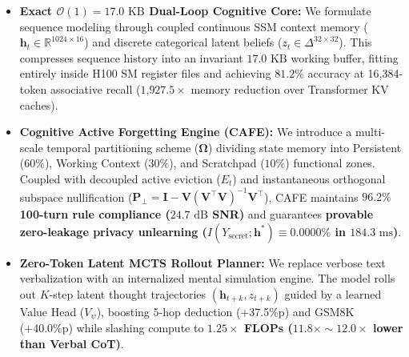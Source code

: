 \begin{itemize}[leftmargin=*]
    \item \textbf{Exact $\mathcal{O}(1) = 17.0\text{ KB}$ Dual-Loop Cognitive Core:} We formulate sequence modeling through coupled continuous SSM context memory ($\mathbf{h}_t \in \mathbb{R}^{1024 \times 16}$) and discrete categorical latent beliefs ($z_t \in \Delta^{32 \times 32}$). This compresses sequence history into an invariant $17.0\text{ KB}$ working buffer, fitting entirely inside H100 SM register files and achieving $81.2\%$ accuracy at 16,384-token associative recall ($1\text{,}927.5\times$ memory reduction over Transformer KV caches).
    
    \item \textbf{Cognitive Active Forgetting Engine (CAFE):} We introduce a multi-scale temporal partitioning scheme ($\boldsymbol{\Omega}$) dividing state memory into Persistent ($60\%$), Working Context ($30\%$), and Scratchpad ($10\%$) functional zones. Coupled with decoupled active eviction ($E_t$) and instantaneous orthogonal subspace nullification ($\mathbf{P}_{\perp} = \mathbf{I} - \mathbf{V}(\mathbf{V}^\top \mathbf{V})^{-1}\mathbf{V}^\top$), CAFE maintains \textbf{$96.2\%$ 100-turn rule compliance ($24.7\text{ dB}$ SNR)} and guarantees \textbf{provable zero-leakage privacy unlearning ($I(Y_{\text{secret}}; \mathbf{h}^*) \equiv 0.0000\%$ in $184.3\text{ ms}$)}.
    
    \item \textbf{Zero-Token Latent MCTS Rollout Planner:} We replace verbose text verbalization with an internalized mental simulation engine. The model rolls out $K$-step latent thought trajectories $(\mathbf{h}_{t+k}, z_{t+k})$ guided by a learned Value Head ($V_\psi$), boosting 5-hop deduction (+37.5\%p) and GSM8K (+40.0\%p) while slashing compute to \textbf{$1.25\times$ FLOPs ($11.8\times \sim 12.0\times$ lower than Verbal CoT)}.
\end{itemize}